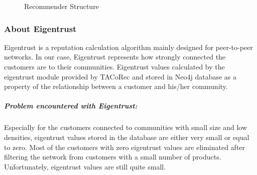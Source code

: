 	\begin{figure}[H]
		\centering
		\caption{Recommender Structure}
	\end{figure}
	\subsubsection{About Eigentrust}
	Eigentrust\cite{Eigentrust} is a reputation calculation algorithm mainly designed for peer-to-peer networks. In our case, Eigentrust represents how strongly connected the customers are to their communities. Eigentrust values calculated by the eigentrust module provided by TACoRec\cite{Tacorec} and stored in Neo4j database as a property of the relationship between a customer and his/her community. 
	\subparagraph{Problem encountered with Eigentrust:}
	Especially for the customers connected to communities with small size and low densities, eigentrust values stored in the database are either very small or equal to zero. Most of the customers with zero eigentrust values are eliminated after filtering the network from customers with a small number of products. Unfortunately, eigentrust values ​​are still quite small.